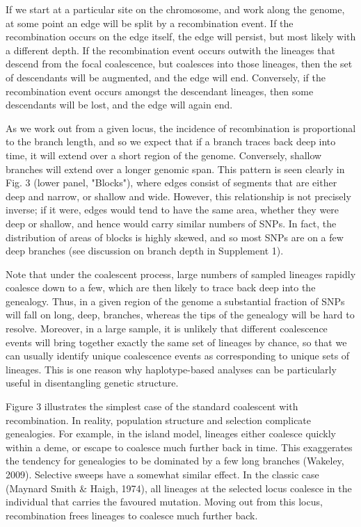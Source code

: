 \documentclass[twocolumn]{bmcart}%
\begin{document}
If we start at a particular site on the chromosome, and work along the genome, at some point an edge will be split by a recombination event. If the recombination occurs on the edge itself, the edge will persist, but most likely with a different depth. If the recombination event occurs outwith the lineages that descend from the focal coalescence, but coalesces into those lineages, then the set of descendants will be augmented, and the edge will end. Conversely, if the recombination event occurs amongst the descendant lineages, then some descendants will be lost, and the edge will again end. 

As we work out from a given locus, the incidence of recombination is proportional to the branch length, and so we expect that if a branch traces back deep into time, it will extend over a short region of the genome. Conversely, shallow branches will extend over a longer genomic span. This pattern is seen clearly in Fig. 3 (lower panel, "Blocks"), where edges consist of segments that are either deep and narrow, or shallow and wide. However, this relationship is not precisely inverse; if it were, edges would tend to have the same area, whether they were deep or shallow, and hence would carry similar numbers of SNPs. In fact, the distribution of areas of blocks is highly skewed, and so most SNPs are on a few deep branches (see discussion on branch depth in Supplement 1).

Note that under the coalescent process, large numbers of sampled lineages rapidly coalesce down to a few, which are then likely to trace back deep into the genealogy. Thus, in a given region of the genome a substantial fraction of SNPs will fall on long, deep, branches, whereas the tips of the genealogy will be hard to resolve. Moreover, in a large sample, it is unlikely that different coalescence events will bring together exactly the same set of lineages by chance, so that we can usually identify unique coalescence events as corresponding to unique sets of lineages. This is one reason why haplotype-based analyses can be particularly useful in disentangling genetic structure.

Figure 3 illustrates the simplest case of the standard coalescent with recombination. In reality, population structure and selection complicate genealogies. For example, in the island model, lineages either coalesce quickly within a deme, or escape to coalesce much further back in time. This exaggerates the tendency for genealogies to be dominated by a few long branches (Wakeley, 2009). Selective sweeps have a somewhat similar effect. In the classic case (Maynard Smith \& Haigh, 1974), all lineages at the selected locus coalesce in the individual that carries the favoured mutation. Moving out from this locus, recombination frees lineages to coalesce much further back.
\end{document}
